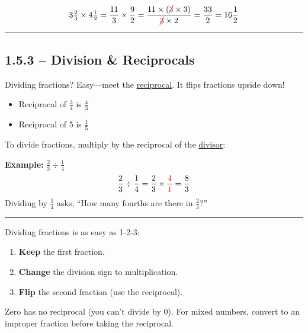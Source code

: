\documentclass[
  letterpaper,
  DIV=11,
  numbers=noendperiod]{scrreprt}
\providecommand{\tightlist}{%
  \setlength{\itemsep}{0pt}\setlength{\parskip}{0pt}}
\begin{document}
\[
3 \tfrac{2}{3} \times 4 \tfrac{1}{2} = \frac{11}{3} \times \frac{9}{2} = \frac{11 \times (\cancel{\color{red}3} \times 3)}{\cancel{\color{red}3} \times 2} = \frac{33}{2} = 16 \frac{1}{2}
\]

\begin{center}\rule{0.5\linewidth}{0.5pt}\end{center}

\subsection*{1.5.3 -- Division \&
Reciprocals}\label{division-reciprocals}

Dividing fractions? Easy---meet the
\href{./glossary.html\#glossary-reciprocal}{reciprocal}. It flips
fractions upside down!

\begin{itemize}
\tightlist
\item
  Reciprocal of \(\frac{3}{4}\) is \(\frac{4}{3}\)
\item
  Reciprocal of 5 is \(\frac{1}{5}\)
\end{itemize}

To divide fractions, multiply by the reciprocal of the
\href{./glossary.html\#glossary-divisor}{divisor}:

\textbf{Example:} \(\frac{2}{3} \div \frac{1}{4}\) \[
\frac{2}{3} \div \frac{1}{4} = \frac{2}{3} \times \frac{\color{red}4}{\color{red}1} = \frac{8}{3}
\] Dividing by \(\frac{1}{4}\) asks, ``How many fourths are there in
\(\frac{2}{3}\)?''

\begin{center}\rule{0.5\linewidth}{0.5pt}\end{center}

Dividing fractions is as easy as 1-2-3:

\begin{enumerate}
\def\labelenumi{\arabic{enumi}.}
\tightlist
\item
  \textbf{Keep} the first fraction.
\item
  \textbf{Change} the division sign to multiplication.
\item
  \textbf{Flip} the second fraction (use the reciprocal).
\end{enumerate}

Zero has no reciprocal (you can't divide by 0). For mixed numbers,
convert to an improper fraction before taking the reciprocal.
\end{document}
